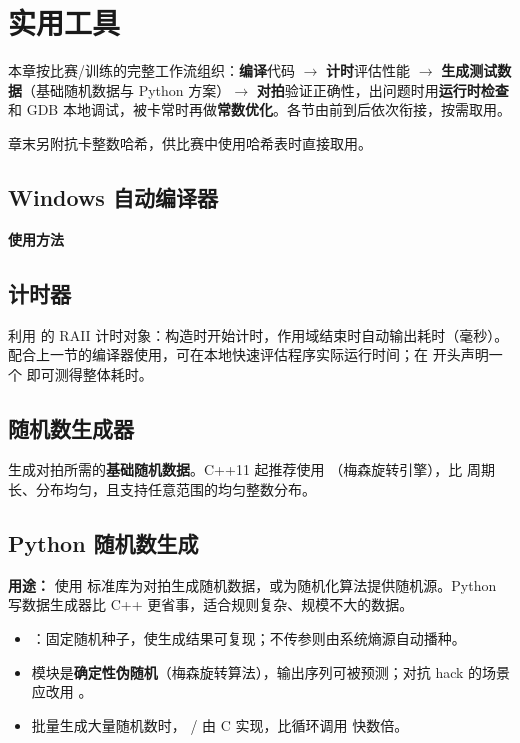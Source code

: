 \section{实用工具}

本章按比赛/训练的完整工作流组织：\textbf{编译}代码 $\to$ \textbf{计时}评估性能 $\to$ \textbf{生成测试数据}（基础随机数据与 Python 方案）$\to$ \textbf{对拍}验证正确性，出问题时用\textbf{运行时检查}和 GDB 本地调试，被卡常时再做\textbf{常数优化}。各节由前到后依次衔接，按需取用。

章末另附抗卡整数哈希，供比赛中使用哈希表时直接取用。

\subsection{Windows 自动编译器}



\textbf{使用方法}


\subsection{计时器}

利用  的 RAII 计时对象：构造时开始计时，作用域结束时自动输出耗时（毫秒）。配合上一节的编译器使用，可在本地快速评估程序实际运行时间；在  开头声明一个  即可测得整体耗时。



\subsection{随机数生成器}

生成对拍所需的\textbf{基础随机数据}。C++11 起推荐使用 （梅森旋转引擎），比  周期长、分布均匀，且支持任意范围的均匀整数分布。



\subsection{Python 随机数生成}

\textbf{用途：} 使用  标准库为对拍生成随机数据，或为随机化算法提供随机源。Python 写数据生成器比 C++ 更省事，适合规则复杂、规模不大的数据。

\begin{itemize}
  \item {}：固定随机种子，使生成结果可复现；不传参则由系统熵源自动播种。
  \item {} 模块是\textbf{确定性伪随机}（梅森旋转算法），输出序列可被预测；对抗 hack 的场景应改用 。
  \item 批量生成大量随机数时， /  由 C 实现，比循环调用  快数倍。
\end{itemize}


